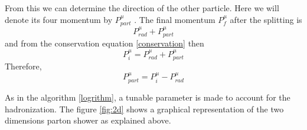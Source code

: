 From this we can determine the direction of the other particle. Here we will denote its four momentum by $P_{part}^{\mu}$ . The final momentum  $P^{\mu}_{f}$ after the splitting is 
\begin{equation}
P_{rad}^{\mu} + P_{part}^{\mu}
\end{equation} and from the conservation equation \ref{conservation} then \begin{equation}
P^{\mu}_{i} = P_{rad}^{\mu} + P_{part}^{\mu}
\end{equation} Therefore, \begin{equation}
P_{part}^{\mu} = P^{\mu}_{i} - P_{rad}^{\mu} 
\end{equation}     

As in the algorithm \ref{logrithm}, a tunable parameter is made to account for the hadronization. The figure \ref{fig:2d} shows a graphical representation of the two dimensions parton shower as explained above. 
     
